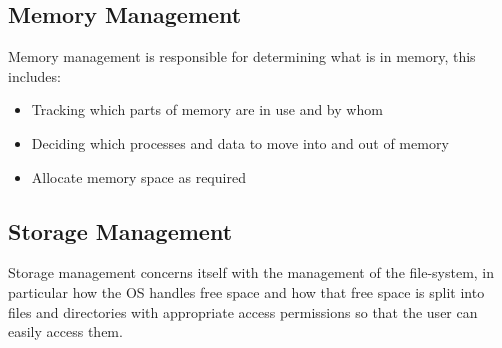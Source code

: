 \subsection{Memory Management}
	
	\par{Memory management is responsible for determining what is in memory, this includes:}

		\begin{itemize}
			\item[]{Tracking which parts of memory are in use and by whom}
			\item[]{Deciding which processes and data to move into and out of memory}
			\item[]{Allocate memory space as required}
		\end{itemize}

\subsection{Storage Management}

	\par{Storage management concerns itself with the management of the file-system, in particular how the OS handles free space and how that free space is split into files and directories with appropriate access permissions so that the user can easily access them.}



